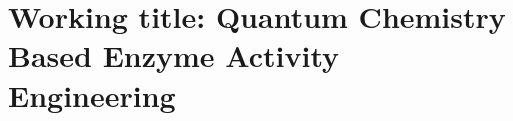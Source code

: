 \chapter[Working title: Quantum Chemistry Based Enzyme Activity Engineering]
{Working title: Quantum Chemistry Based Enzyme Activity Engineering\label{ch1}}


